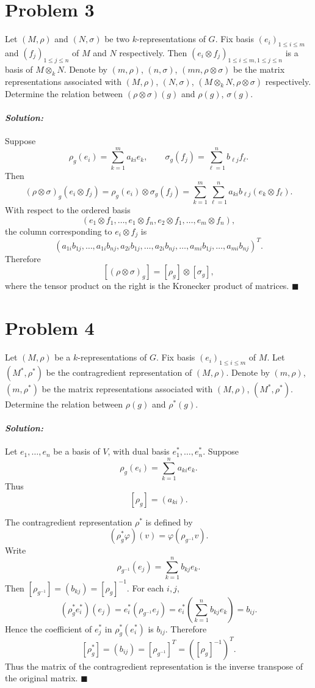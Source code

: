 \documentclass[12pt, a4paper]{article}
\theoremstyle{remark}
\newenvironment{solution}
  {\paragraph{\textit{Solution:}}\par\medskip}
  {\hfill$\blacksquare$\vspace{0.1cm}}
\begin{document}
\section*{Problem 3}
Let $(M, \rho)$ and $(N, \sigma)$ be two $k$-representations of $G$. Fix basis $(e_i)_{1 \le i \le m}$ and $(f_j)_{1 \le j \le n}$ of $M$ and $N$ respectively. Then $(e_i \otimes f_j)_{1 \le i \le m, 1 \le j \le n}$ is a basis of $M \otimes_k N$. Denote by $(m, \rho)$, $(n, \sigma)$, $(mn, \rho \otimes \sigma)$ be the matrix representations associated with $(M, \rho)$, $(N, \sigma)$, $(M \otimes_k N, \rho \otimes \sigma)$ respectively.
Determine the relation between $(\rho \otimes \sigma)(g)$ and $\rho(g)$, $\sigma(g)$.
\begin{solution}
    Suppose
\[
\rho_g(e_i)=\sum_{k=1}^m a_{ki}e_k,
\qquad
\sigma_g(f_j)=\sum_{\ell=1}^n b_{\ell j}f_\ell .
\]
Then
\[
(\rho\otimes\sigma)_g(e_i\otimes f_j)
=
\rho_g(e_i)\otimes\sigma_g(f_j)
=
\sum_{k=1}^m\sum_{\ell=1}^n
a_{ki}b_{\ell j}(e_k\otimes f_\ell).
\]
With respect to the ordered basis
\[
(e_1\otimes f_1,\ldots,e_1\otimes f_n,
e_2\otimes f_1,\ldots,e_m\otimes f_n),
\]
the column corresponding to \(e_i\otimes f_j\) is
\[
(a_{1i}b_{1j},\ldots,a_{1i}b_{nj},
a_{2i}b_{1j},\ldots,a_{2i}b_{nj},
\ldots,
a_{mi}b_{1j},\ldots,a_{mi}b_{nj})^T.
\]
Therefore
\[
[(\rho\otimes\sigma)_g]=[\rho_g]\otimes[\sigma_g],
\]
where the tensor product on the right is the Kronecker product of matrices.
\end{solution}



\section*{Problem 4}
Let $(M, \rho)$ be a $k$-representations of $G$. Fix basis $(e_i)_{1 \le i \le m}$ of $M$. Let $(M^*, \rho^*)$ be the contragredient representation of $(M, \rho)$. Denote by $(m, \rho)$, $(m, \rho^*)$ be the matrix representations associated with $(M, \rho)$, $(M^*, \rho^*)$.
Determine the relation between $\rho(g)$ and $\rho^*(g)$.

\begin{solution}
Let \(e_1,\dots,e_n\) be a basis of \(V\), with dual basis
\(e_1^*,\dots,e_n^*\). Suppose
\[
\rho_g(e_i)=\sum_{k=1}^n a_{ki}e_k.
\]
Thus
\[
[\rho_g]=(a_{ki}).
\]

The contragredient representation \(\rho^*\) is defined by
\[
(\rho_g^*\varphi)(v)=\varphi(\rho_{g^{-1}}v).
\]
Write
\[
\rho_{g^{-1}}(e_j)=\sum_{k=1}^n b_{kj}e_k.
\]
Then \([\rho_{g^{-1}}]=(b_{kj})=[\rho_g]^{-1}\). For each \(i,j\),
\[
(\rho_g^*e_i^*)(e_j)
=
e_i^*(\rho_{g^{-1}}e_j)
=
e_i^*\left(\sum_{k=1}^n b_{kj}e_k\right)
=
b_{ij}.
\]
Hence the coefficient of \(e_j^*\) in \(\rho_g^*(e_i^*)\) is \(b_{ij}\). Therefore
\[
[\rho_g^*]=(b_{ij})= [\rho_{g^{-1}}]^T=([\rho_g]^{-1})^T.
\]
Thus the matrix of the contragredient representation is the inverse transpose
of the original matrix.
\end{solution}
\end{document}
